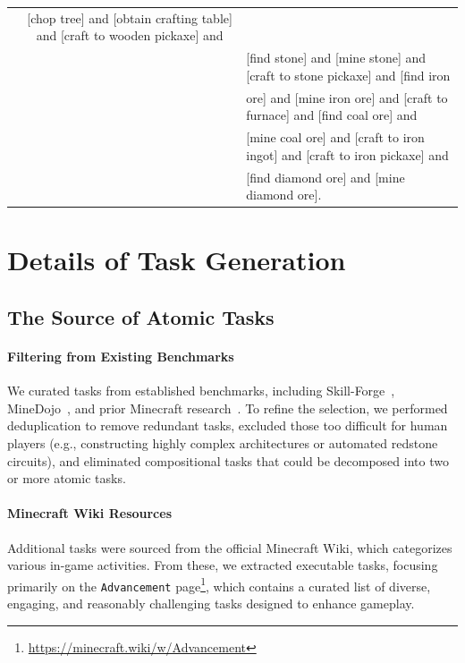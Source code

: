 \begin{table}[h]
{\begin{tabular}{c|c|l}
    &[chop tree] and [obtain crafting table] and [craft to wooden pickaxe] and \\
    &&[find stone] and [mine stone] and [craft to stone pickaxe] and [find iron \\
    &&ore] and [mine iron ore] and [craft to furnace] and [find coal ore] and \\
    &&[mine coal ore] and [craft to iron ingot] and [craft to iron pickaxe] and \\
    &&[find diamond ore] and [mine diamond ore].\\
    \hline
  \end{tabular}}

  \label{tab:task_relationship}
\end{table}
\fi


\newpage
\section{Details of Task Generation}

\subsection{The Source of Atomic Tasks}

\paragraph{Filtering from Existing Benchmarks} 
We curated tasks from established benchmarks, including Skill-Forge~\citep{groot}, MineDojo~\citep{minedojo}, and prior Minecraft research~\citep{vpt,plan4mc,deps,jarvis1}. To refine the selection, we performed deduplication to remove redundant tasks, excluded those too difficult for human players (e.g., constructing highly complex architectures or automated redstone circuits), and eliminated compositional tasks that could be decomposed into two or more atomic tasks.

\paragraph{Minecraft Wiki Resources} 
Additional tasks were sourced from the official Minecraft Wiki, which categorizes various in-game activities. From these, we extracted executable tasks, focusing primarily on the \texttt{Advancement} page\footnote{\url{https://minecraft.wiki/w/Advancement}}, which contains a curated list of diverse, engaging, and reasonably challenging tasks designed to enhance gameplay.


